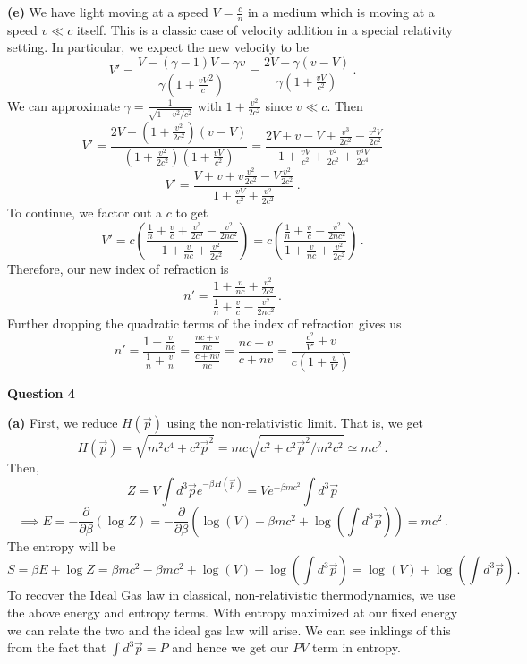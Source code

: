 \documentclass[10pt]{article}
\newcommand{\di}[2][]{\frac{\partial #1}{\partial #2}}
\begin{document}
\textbf{(e)} We have light moving at a speed $V = \frac{c}{n}$ in a medium which is moving at a speed $v \ll c$ itself. This is a classic case of velocity addition in a special relativity setting. In particular, we expect the new velocity to be
\[ V' = \frac{V  - (\gamma - 1)V + \gamma v}{\gamma(1+\frac{vV}c^{2})} = \frac{2V + \gamma(v - V)}{\gamma(1+ \frac{vV}{c^{2}})} \, .\]
We can approximate $\gamma = \frac{1}{\sqrt{1 - v^{2}/c^{2}}}$ with $1 + \frac{v^{2}}{2c^{2}}$ since $v \ll c$. Then
\[ V' = \frac{2V + (1 + \frac{v^{2}}{2c^{2}})(v - V)}{(1 + \frac{v^{2}}{2c^{2}})(1 + \frac{vV}{c^{2}})} = \frac{2V + v - V + \frac{v^{3}}{2c^{2}} - \frac{v^{2}V}{2c^{2}}}{1 + \frac{vV}{c^{2}} + \frac{v^{2}}{2c^{2}} + \frac{v^{3}V}{2c^{4}}} \]
\[ V' = \frac{V + v + v\frac{v^{2}}{2c^{2}} - V\frac{v^{2}}{2c^{2}}}{1 + \frac{vV}{c^{2}} + \frac{v^{2}}{2c^{2}}}\, . \]
To continue, we factor out a $c$ to get
\[ V' = c\left(\frac{\frac{1}{n} + \frac{v}{c} + \frac{v^{3}}{2c^{3}} - \frac{v^{2}}{2nc^{2}}}{1 + \frac{v}{nc} + \frac{v^{2}}{2c^{2}}}\right) = c\left(\frac{\frac{1}{n} + \frac{v}{c} - \frac{v^{2}}{2nc^{2}}}{1 + \frac{v}{nc} + \frac{v^{2}}{2c^{2}}}\right) \, .\]
Therefore, our new index of refraction is
\[ n' = \frac{1 + \frac{v}{nc} + \frac{v^{2}}{2c^{2}}}{\frac{1}{n} + \frac{v}{c} - \frac{v^{2}}{2nc^{2}}} \, .\]
Further dropping the quadratic terms of the index of refraction gives us
\[ n' = \frac{1 + \frac{v}{nc}}{\frac{1}{n} + \frac{v}{n}} = \frac{\frac{nc + v}{nc}}{\frac{c + nv}{nc}} = \frac{nc + v}{c + nv} = \frac{\frac{c^{2}}{V'} + v}{c\left(1 + \frac{v}{V'}\right)}\]

\newpage
\textbf{Question 4}

\textbf{(a)} First, we reduce $H(\vec{p})$ using the non-relativistic limit. That is, we get
\[ H(\vec{p}) = \sqrt{m^{2}c^{4} + c^{2}\vec{p}^{2}} = mc\sqrt{c^{2} + c^{2}\vec{p}^{2}/m^{2}c^{2}} \simeq mc^{2} \, .\]
Then,
\[ Z = V\int d^{3}\vec{p}e^{-\beta H(\vec{p})} = Ve^{-\beta mc^{2}}\int d^{3}\vec{p} \]
\[ \implies E = -\di{\beta}(\log Z) = -\di{\beta}\left(\log(V) - \beta mc^{2} + \log\left(\int d^{3}\vec{p}\right)\right) = mc^{2}\, .\]
The entropy will be
\[ S = \beta E + \log Z = \beta mc^{2} - \beta mc^{2} + \log(V) + \log\left(\int d^{3}\vec{p}\right) = \log(V) + \log\left(\int d^{3}\vec{p}\right) \, .\]
To recover the Ideal Gas law in classical, non-relativistic thermodynamics, we use the above energy and entropy terms. With entropy maximized at our fixed energy we can relate the two and the ideal gas law will arise. We can see inklings of this from the fact that $\int d^{3}\vec{p} = P$ and hence we get our $PV$ term in entropy. 
\end{document}

